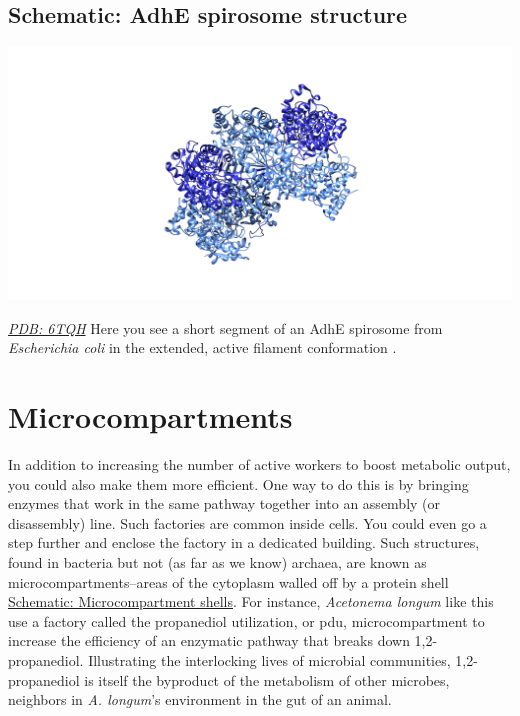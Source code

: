 \documentclass[]{tufte-book}
\begin{document}
\hypertarget{AdhE_spirosome_structure}{%
\subsection*{Schematic: AdhE spirosome structure}\label{AdhE_spirosome_structure}}

\includegraphics{img/schematics/4_5_1}

\href{http://rcsb.org/structure/6TQH}{\emph{PDB: 6TQH}}
Here you see a short segment of an AdhE spirosome from \emph{Escherichia coli} in the extended, active filament conformation \citep{pony2020}.

\hypertarget{microcompartments}{%
\section{Microcompartments}\label{microcompartments}}

In addition to increasing the number of active workers to boost metabolic output, you could also make them more efficient. One way to do this is by bringing enzymes that work in the same pathway together into an assembly (or disassembly) line. Such factories are common inside cells. You could even go a step further and enclose the factory in a dedicated building. Such structures, found in bacteria but not (as far as we know) archaea, are known as microcompartments--areas of the cytoplasm walled off by a protein shell \protect\hyperlink{Microcompartment_shells}{Schematic: Microcompartment shells}. For instance, \emph{Acetonema longum} like this use a factory called the propanediol utilization, or pdu, microcompartment to increase the efficiency of an enzymatic pathway that breaks down 1,2-propanediol. Illustrating the interlocking lives of microbial communities, 1,2-propanediol is itself the byproduct of the metabolism of other microbes, neighbors in \emph{A. longum}'s environment in the gut of an animal.
\end{document}

